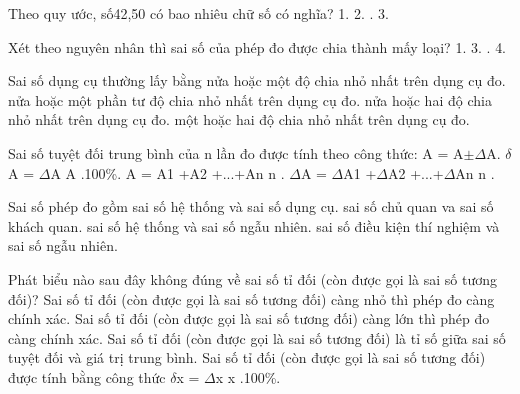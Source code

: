 \begin{ex}
Theo quy ước, số42,50 có bao nhiêu chữ số có nghĩa?
\choice
{1.}
{2.}
{.}
{3.}
\end{ex}

\begin{ex}
Xét theo nguyên nhân thì sai số của phép đo được chia thành mấy loại?
\choice
{1.}
{3.}
{.}
{4.}
\end{ex}

\begin{ex}
Sai số dụng cụ thường lấy bằng
\choice
{\True nửa hoặc một độ chia nhỏ nhất trên dụng cụ đo.}
{nửa hoặc một phần tư độ chia nhỏ nhất trên dụng cụ đo.}
{nửa hoặc hai độ chia nhỏ nhất trên dụng cụ đo.}
{một hoặc hai độ chia nhỏ nhất trên dụng cụ đo.}
\end{ex}

\begin{ex}
Sai số tuyệt đối trung bình của n lần đo được tính theo công thức:
\choice
{A = A$\pm$$\Delta$A.}
{$\delta$A = $\Delta$A A .100\%.}
{A = A1 +A2 +...+An n .}
{\True $\Delta$A = $\Delta$A1 +$\Delta$A2 +...+$\Delta$An n .}
\end{ex}

\begin{ex}
Sai số phép đo gồm
\choice
{sai số hệ thống và sai số dụng cụ.}
{sai số chủ quan va sai số khách quan.}
{\True sai số hệ thống và sai số ngẫu nhiên.}
{sai số điều kiện thí nghiệm và sai số ngẫu nhiên.}
\end{ex}

\begin{ex}
Phát biểu nào sau đây không đúng về sai số tỉ đối (còn được gọi là sai số
tương đối)?
\choice
{Sai số tỉ đối (còn được gọi là sai số tương đối) càng nhỏ thì phép đo càng chính xác.}
{\True Sai số tỉ đối (còn được gọi là sai số tương đối) càng lớn thì phép đo càng chính xác.}
{Sai số tỉ đối (còn được gọi là sai số tương đối) là tỉ số giữa sai số tuyệt đối và giá trị trung bình.}
{Sai số tỉ đối (còn được gọi là sai số tương đối) được tính bằng công thức $\delta$x = $\Delta$x x .100\%.}
\end{ex}

